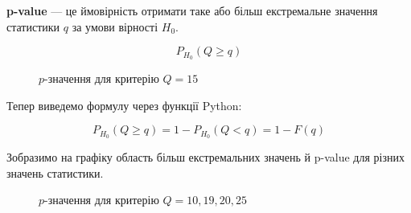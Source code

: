 \documentclass[
  letterpaper,
  10pt,
  openany]{report}
\theoremstyle{definition}
\theoremstyle{remark}
\begin{document}
\textbf{p-value} --- це ймовірність отримати таке або більш екстремальне
значення статистики \(q\) за умови вірності \(H_0\).

\[
P_{H_0}(Q \geqslant q)
\]

\begin{figure}[H]


\caption{\label{fig-binom-pmf-p-value}\(p\)-значення для критерію
\(Q = 15\)}

\end{figure}%

Тепер виведемо формулу через функції Python:

\[
P_{H_0}(Q \geqslant q) = 1 - P_{H_0}(Q < q) = 1 - F(q)
\]

Зобразимо на графіку область більш екстремальних значень й p-value для
різних значень статистики.

\begin{figure}[H]


\caption{\label{fig-binom-pmf-p-values}\(p\)-значення для критерію
\(Q = 10, 19, 20, 25\)}

\end{figure}%
\end{document}
